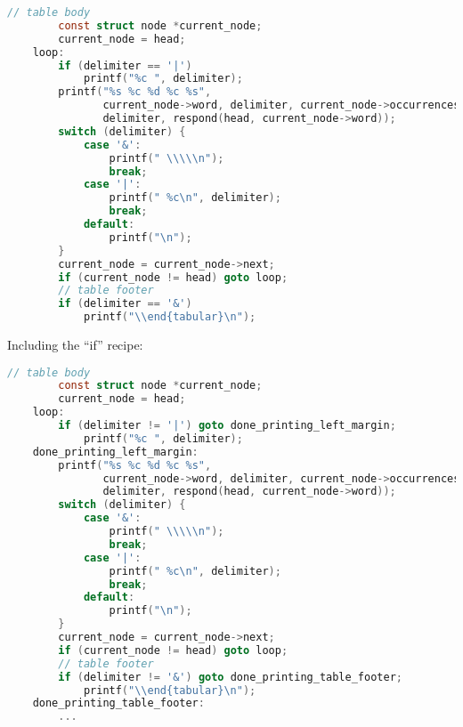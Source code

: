 \documentclass{article}
\begin{document}
\begin{lstlisting}[language=C, linebackgroundcolor={
    %    \ifodd\value{lstnumber}\color{green}\fi
    \ifnum\value{lstnumber}=4 \color{green}\fi,
    \ifnum\value{lstnumber}=21 \color{green}\fi,
    \ifnum\value{lstnumber}=5 \color{yellow}\fi,
    \ifnum\value{lstnumber}=23 \color{magenta}\fi,
}]
        // table body
        const struct node *current_node;
        current_node = head;
    loop:
        if (delimiter == '|')
            printf("%c ", delimiter);
        printf("%s %c %d %c %s",
               current_node->word, delimiter, current_node->occurrences,
               delimiter, respond(head, current_node->word));
        switch (delimiter) {
            case '&':
                printf(" \\\\\n");
                break;
            case '|':
                printf(" %c\n", delimiter);
                break;
            default:
                printf("\n");
        }
        current_node = current_node->next;
        if (current_node != head) goto loop;
        // table footer
        if (delimiter == '&')
            printf("\\end{tabular}\n");
\end{lstlisting}
\newpage
Including the ``if'' recipe:

\begin{lstlisting}[language=C, linebackgroundcolor={
    %    \ifodd\value{lstnumber}\color{green}\fi
    \ifnum\value{lstnumber}=4 \color{green}\fi,
    \ifnum\value{lstnumber}=22 \color{green}\fi,
    \ifnum\value{lstnumber}=5 \color{yellow}\fi,
    \ifnum\value{lstnumber}=7 \color{yellow}\fi,
    \ifnum\value{lstnumber}=24 \color{magenta}\fi,
    \ifnum\value{lstnumber}=26 \color{magenta}\fi,
}]
        // table body
        const struct node *current_node;
        current_node = head;
    loop:
        if (delimiter != '|') goto done_printing_left_margin;
            printf("%c ", delimiter);
    done_printing_left_margin:
        printf("%s %c %d %c %s",
               current_node->word, delimiter, current_node->occurrences,
               delimiter, respond(head, current_node->word));
        switch (delimiter) {
            case '&':
                printf(" \\\\\n");
                break;
            case '|':
                printf(" %c\n", delimiter);
                break;
            default:
                printf("\n");
        }
        current_node = current_node->next;
        if (current_node != head) goto loop;
        // table footer
        if (delimiter != '&') goto done_printing_table_footer;
            printf("\\end{tabular}\n");
    done_printing_table_footer:
        ...
\end{lstlisting}
\end{document}
